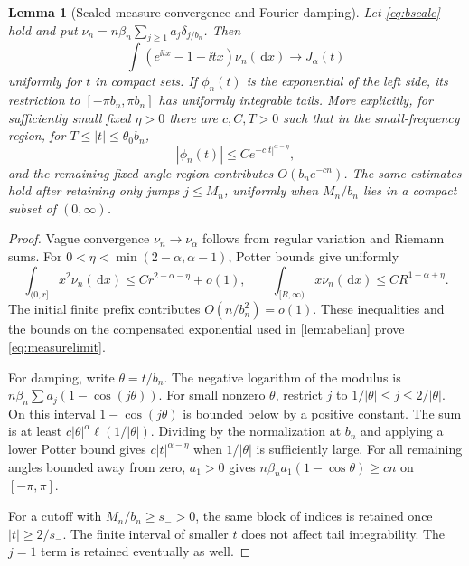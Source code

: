 \documentclass[11pt,a4paper]{article}
\numberwithin{equation}{section}
\newtheorem{lemma}[theorem]{Lemma}
\theoremstyle{definition}\newtheorem{definition}[theorem]{Definition}
\theoremstyle{remark}\newtheorem{remark}[theorem]{Remark}
\theoremstyle{definition}
\newcommand{\dd}{\,\mathrm d}
\begin{document}
\begin{lemma}[Scaled measure convergence and Fourier damping]
\label{lem:fourier}
Let \eqref{eq:bscale} hold and put
$\nu_n=n\beta_n\sum_{j\ge1}a_j\delta_{j/b_n}$. Then
\begin{equation}\label{eq:measurelimit}
 \int(e^{\ii tx}-1-\ii tx)\nu_n(\dd x)\longrightarrow J_\alpha(t)
\end{equation}
uniformly for $t$ in compact sets. If $\phi_n(t)$ is the exponential of
the left side, its restriction to $[-\pi b_n,\pi b_n]$ has uniformly
integrable tails. More explicitly, for sufficiently small fixed $\eta>0$
there are $c,C,T>0$ such that in the small-frequency region, for
$T\le |t|\le\theta_0 b_n$,
\begin{equation}\label{eq:damping}
 |\phi_n(t)|\le C e^{-c|t|^{\alpha-\eta}},
\end{equation}
and the remaining fixed-angle region contributes $O(b_n e^{-cn})$.
The same estimates hold after retaining only jumps $j\le M_n$, uniformly
when $M_n/b_n$ lies in a compact subset of $(0,\infty)$.
\end{lemma}
\begin{proof}
Vague convergence $\nu_n\to\nu_\alpha$ follows from regular variation
and Riemann sums. For
$0<\eta<\min(2-\alpha,\alpha-1)$, Potter bounds give uniformly
\[
 \int_{(0,r]}x^2\nu_n(\dd x)\le C r^{2-\alpha-\eta}+o(1),\qquad
 \int_{[R,\infty)}x\nu_n(\dd x)\le C R^{1-\alpha+\eta}.
\]
The initial finite prefix contributes $O(n/b_n^2)=o(1)$.
These inequalities and the bounds on the compensated exponential used
in \cref{lem:abelian} prove \eqref{eq:measurelimit}.

For damping, write $\theta=t/b_n$. The negative logarithm of the modulus
is $n\beta_n\sum a_j(1-\cos(j\theta))$. For small nonzero $\theta$,
restrict $j$ to $1/|\theta|\le j\le2/|\theta|$. On this interval
$1-\cos(j\theta)$ is bounded below by a positive constant. The sum is at
least $c|\theta|^\alpha\ell(1/|\theta|)$. Dividing by the normalization at
$b_n$ and applying a lower Potter bound gives $c|t|^{\alpha-\eta}$ when
$1/|\theta|$ is sufficiently large. For all remaining angles bounded away
from zero, $a_1>0$ gives
$n\beta_n a_1(1-\cos\theta)\ge cn$ on $[-\pi,\pi]$.

For a cutoff with $M_n/b_n\ge s_->0$, the same block of indices is retained
once $|t|\ge2/s_-$. The finite interval of smaller $t$ does not affect
tail integrability. The $j=1$ term is retained eventually as well.
\end{proof}
\end{document}
